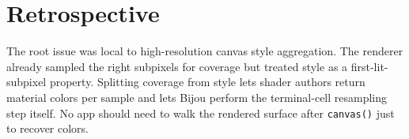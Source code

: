 \section{Retrospective}\label{record-158-retrospective}

The root issue was local to high-resolution canvas style aggregation. The renderer already sampled the right subpixels for coverage but treated style as a first-lit-subpixel property. Splitting coverage from style lets shader authors return material colors per sample and lets Bijou perform the terminal-cell resampling step itself. No app should need to walk the rendered surface after \texttt{c\allowbreak{}a\allowbreak{}n\allowbreak{}v\allowbreak{}a\allowbreak{}s\allowbreak{}(\allowbreak{})} just to recover colors.

